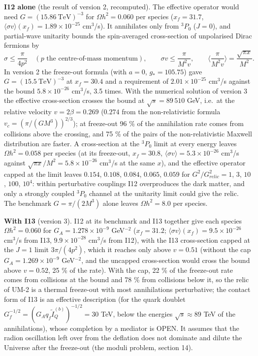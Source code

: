 \documentclass[
  10pt,
]{article}
\begin{document}
\textbf{I12 alone} (the result of version 2, recomputed). The effective
operator would need \(G = (15.86\ \text{TeV})^{-3}\) for
\(\Omega h^2 = 0.060\) per species (\(x_f = 31.7\),
\(\langle\sigma v\rangle(x_f) = 1.89\times10^{-25}\) cm\(^3\)/s). It
annihilates only from \(^3P_0\) (\(J = 0\)), and partial-wave unitarity
bounds the spin-averaged cross-section of unpolarised Dirac fermions by
\[ \sigma \le \frac{\pi}{4p^2}\quad (p \text{ the centre-of-mass momentum}),\qquad \sigma v \le \frac{\pi}{M^2v},\qquad \Big\langle\frac{\pi}{M^2v}\Big\rangle = \frac{\sqrt{\pi x}}{M^2} . \]
In version 2 the freeze-out formula (with \(a = 0\), \(g_* = 105.75\))
gave \(G = (15.5\ \text{TeV})^{-3}\) at \(x_f = 30.4\) and a requirement
of \(2.01\times10^{-25}\) cm\(^3\)/s against the bound
\(5.8\times10^{-26}\) cm\(^3\)/s, 3.5 times. With the numerical solution
of version 3 the effective cross-section crosses the bound at
\(\sqrt s = 89\,510\) GeV, i.e.~at the relative velocity
\(v = 2\beta = 0.269\) (\(0.274\) from the non-relativistic formula
\(v_c = (\pi/(GM^3))^{2/3}\)); at freeze-out 96 \% of the annihilation
rate comes from collisions above the crossing, and 75 \% of the pairs of
the non-relativistic Maxwell distribution are faster. A cross-section at
the \(^3P_0\) limit at every energy leaves \(\Omega h^2 = 0.058\) per
species (at its freeze-out, \(x_f = 30.8\),
\(\langle\sigma v\rangle = 5.3\times10^{-26}\) cm\(^3\)/s against
\(\sqrt{\pi x}/M^2 = 5.8\times10^{-26}\) cm\(^3\)/s at the same \(x\)),
and the effective operator capped at the limit leaves \(0.154\),
\(0.108\), \(0.084\), \(0.065\), \(0.059\) for \(G^2/G^2_{relic} = 1\),
\(3\), \(10\), \(100\), \(10^4\): within perturbative couplings I12
overproduces the dark matter, and only a strongly coupled \(^3P_0\)
channel at the unitarity limit could give the relic. The benchmark
\(G = \pi/(2M^3)\) alone leaves \(\Omega h^2 = 8.0\) per species.

\textbf{With I13} (version 3). I12 at its benchmark and I13 together
give each species \(\Omega h^2 = 0.060\) for
\(G_A = 1.278\times10^{-9}\) GeV\(^{-2}\) (\(x_f = 31.2\);
\(\langle\sigma v\rangle(x_f) = 9.5\times10^{-26}\) cm\(^3\)/s from I13,
\(9.9\times10^{-28}\) cm\(^3\)/s from I12), with the I13 cross-section
capped at the \(J = 1\) limit \(3\pi/(4p^2)\), which it reaches only
above \(v = 0.51\) (without the cap \(G_A = 1.269\times10^{-9}\)
GeV\(^{-2}\), and the uncapped cross-section would cross the bound above
\(v = 0.52\), 25 \% of the rate). With the cap, 22 \% of the freeze-out
rate comes from collisions at the bound and 78 \% from collisions below
it, so the relic of UM-2 is a thermal freeze-out with most annihilations
perturbative; the contact form of I13 is an effective description (for
the quark doublet \(G_f^{-1/2} = (G_Aq_f\tilde I^{(b)}_Q)^{-1/2} = 30\)
TeV, below the energies \(\sqrt s \approx 89\) TeV of the
annihilations), whose completion by a mediator is OPEN. It assumes that
the radion oscillation left over from the deflation does not dominate
and dilute the Universe after the freeze-out (the moduli problem,
section 14).
\end{document}
